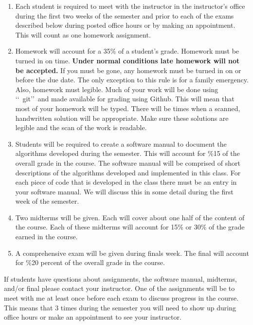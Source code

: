 \documentclass[10pt,fleqn]{article}
\begin{document}
\begin{enumerate}
\item Each student is required to meet with the instructor in the instructor's
      office during the first two weeks of the semester and prior to each of the
      exams described below during posted office hours or by making an
      appointment. This will count as one homework assignment.
\item Homework will account for a 35\% of a student's grade. Homework must be
      turned in on time. {\bf Under normal conditions late homework will not be
      accepted.} If you must be gone, any homework must be turned in on or
      before the due date. The only exception to this rule is for a family
      emergency. Also, homework must legible. Much of your work will be done
      using \lq\lq\ git\rq\rq\ and made available for grading using Github. This
      will mean that most of your homework will be typed. There will be times
      when a scanned, handwritten solution will be appropriate. Make sure these
      solutions are legible and the scan of the work is readable.
\item Students will be required to create a software manual to document the
      algorithms developed during the semester. This will account for \%15 of
      the overall grade in the course. The software manual will be comprised of
      short descriptions of the algorithms developed and implemented in this
      class. For each piece of code that is developed in the class there must be
      an entry in your software manual. We will discuss this in some detail
      during the first week of the semester.
\item Two midterms will be given. Each will cover about one half of the content
      of the course. Each of these midterms will account for 15\% or 30\% of the
      grade earned in the course.
\item A comprehensive exam will be given during finals week. The final will
      account for \%20 percent of the overall grade in the course.
\end{enumerate}
If students have questions about assignments, the software manual, midterms, 
and/or final please contact your instructor. One of the assignments will be to
meet with me at least once before each exam to discuss progress in the course.
This means that 3 times during the semester you will need to show up during
office hours or make an appointment to see your instructor.
\end{document}
